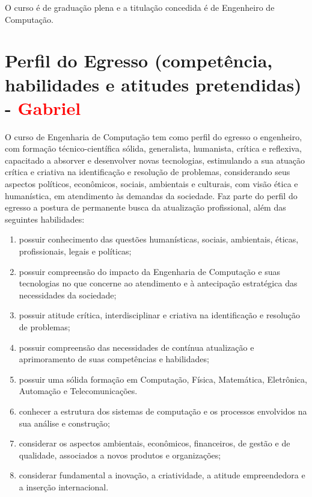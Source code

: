 O curso é de graduação plena e a titulação concedida é de Engenheiro de Computação.

\section{Perfil do Egresso (competência, habilidades e atitudes pretendidas) - \textcolor{red}{Gabriel}}

O curso de Engenharia de Computação tem como perfil do egresso o engenheiro, com formação técnico-científica sólida, generalista, humanista, crítica e reflexiva, capacitado a absorver e desenvolver novas tecnologias, estimulando a sua atuação crítica e criativa na identificação e resolução de problemas, considerando seus aspectos políticos, econômicos, sociais, ambientais e culturais, com visão ética e humanística, em atendimento às demandas da sociedade. Faz parte do perfil do egresso a postura de permanente busca da atualização profissional, além das seguintes habilidades:
\begin{enumerate} [I -]
    \item possuir conhecimento das questões humanísticas, sociais, ambientais, éticas, profissionais, legais e políticas;
    \item possuir compreensão do impacto da Engenharia de Computação e suas tecnologias no que concerne ao atendimento e à antecipação estratégica das necessidades da sociedade;
    \item possuir atitude crítica, interdisciplinar e criativa na identificação e resolução de problemas;
    \item possuir compreensão das necessidades de contínua atualização e aprimoramento de suas competências e habilidades;
    \item possuir uma sólida formação em Computação, Física, Matemática, Eletrônica, Automação e Telecomunicações.
    \item conhecer a estrutura dos sistemas de computação e os processos envolvidos na sua análise e construção;
    \item considerar os aspectos ambientais, econômicos, financeiros, de gestão e de qualidade, associados a novos produtos e organizações;
    \item considerar fundamental a inovação, a criatividade, a atitude empreendedora e a inserção internacional.
\end{enumerate}

